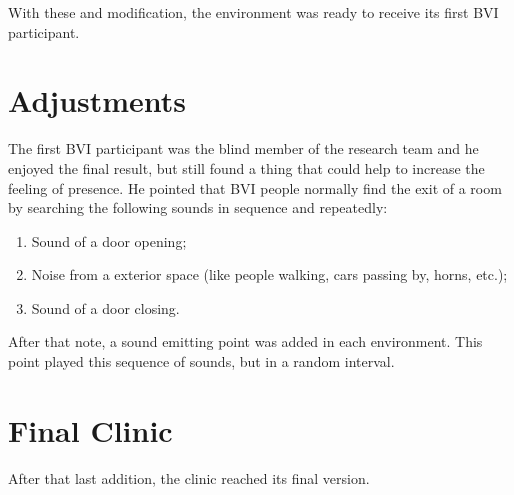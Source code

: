     With these  and  modification, the environment was ready to receive its first BVI participant.
        
\section{Adjustments}

    The first BVI participant was the blind member of the research team and he enjoyed the final result, but still found a thing that could help to increase the feeling of presence. He pointed that BVI people normally find the exit of a room by searching the following sounds in sequence and repeatedly:
    \begin{enumerate}
        \item Sound of a door opening;
        \item Noise from a exterior space (like people walking, cars passing by, horns, etc.);
        \item Sound of a door closing.
    \end{enumerate}
    After that note, a sound emitting point was added in each environment. This point played this sequence of sounds, but in a random interval.

\section{Final Clinic}

    After that last addition, the clinic reached its final version.


